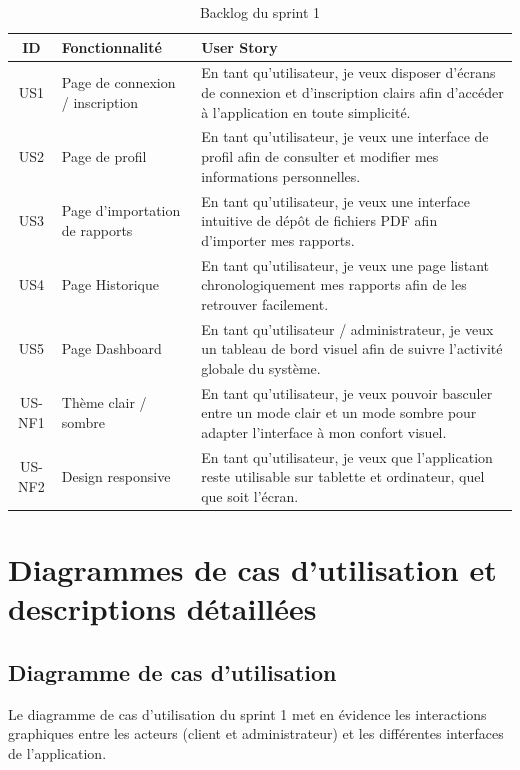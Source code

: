 \begin{table}[h!]
\centering
\caption{Backlog du sprint 1}
\label{tab:backlog-sprint1}
\renewcommand{\arraystretch}{1.3}
\begin{tabularx}{\textwidth}{|c|l|X|}
\hline
\textbf{ID} & \textbf{Fonctionnalité} & \textbf{User Story} \\ \hline
US1 & Page de connexion / inscription &
En tant qu'utilisateur, je veux disposer d'écrans de connexion et d'inscription clairs
afin d'accéder à l'application en toute simplicité. \\ \hline
US2 & Page de profil &
En tant qu'utilisateur, je veux une interface de profil afin de consulter et modifier
mes informations personnelles. \\ \hline
US3 & Page d'importation de rapports &
En tant qu'utilisateur, je veux une interface intuitive de dépôt de fichiers PDF afin
d'importer mes rapports. \\ \hline
US4 & Page Historique &
En tant qu'utilisateur, je veux une page listant chronologiquement mes rapports afin de
les retrouver facilement. \\ \hline
US5 & Page Dashboard &
En tant qu'utilisateur / administrateur, je veux un tableau de bord visuel afin de
suivre l'activité globale du système. \\ \hline
US-NF1 & Thème clair / sombre &
En tant qu'utilisateur, je veux pouvoir basculer entre un mode clair et un mode sombre
pour adapter l'interface à mon confort visuel. \\ \hline
US-NF2 & Design responsive &
En tant qu'utilisateur, je veux que l'application reste utilisable sur tablette et
ordinateur, quel que soit l'écran. \\ \hline
\end{tabularx}
\end{table}

\section{Diagrammes de cas d'utilisation et descriptions détaillées}

\subsection{Diagramme de cas d'utilisation}
Le diagramme de cas d'utilisation du sprint 1 met en évidence les interactions
graphiques entre les acteurs (client et administrateur) et les différentes
interfaces de l'application.

